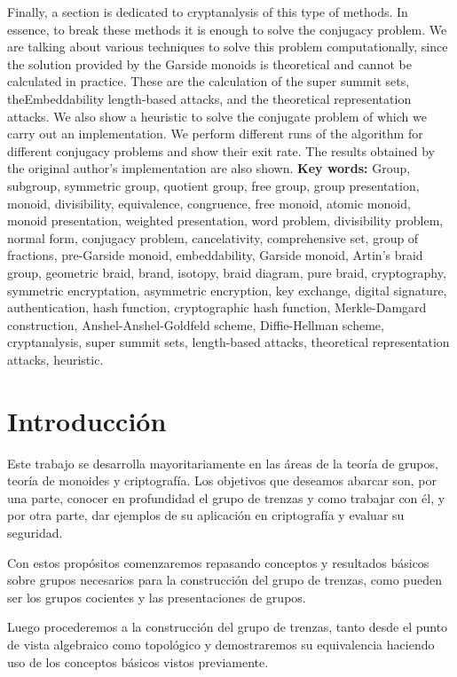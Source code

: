 \documentclass[12pt]{book}
\theoremstyle{definition}
\begin{document}
Finally, a section is dedicated to cryptanalysis of this type of methods. In essence, to break these methods it is enough to solve the conjugacy problem. We are talking about various techniques to solve this problem computationally, since the solution provided by the Garside monoids is theoretical and cannot be calculated in practice. These are the calculation of the super summit sets, theEmbeddability length-based attacks, and the theoretical representation attacks. We also show a heuristic to solve the conjugate problem of which we carry out an implementation. We perform different runs of the algorithm for different conjugacy problems and show their exit rate. The results obtained by the original author's implementation are also shown.
\newline
\newline
\textbf{Key words:} Group, subgroup, symmetric group, quotient group, free group, group presentation, monoid, divisibility, equivalence, congruence, free monoid, atomic monoid, monoid presentation,  weighted presentation, word problem, divisibility problem, normal form, conjugacy problem, cancelativity, comprehensive set, group of fractions, pre-Garside monoid, embeddability, Garside monoid, Artin’s braid group, geometric braid, brand, isotopy, braid diagram, pure braid, cryptography, symmetric encryptation, asymmetric encryption, key exchange, digital signature, authentication, hash function, cryptographic hash function, Merkle-Damgard construction, Anshel-Anshel-Goldfeld scheme, Diffie-Hellman scheme, cryptanalysis, super summit sets, length-based attacks, theoretical representation attacks, heuristic.
\chapter{Introducción}
Este trabajo se desarrolla mayoritariamente en las áreas de la teoría de grupos, teoría de monoides y criptografía.  Los objetivos que deseamos abarcar son, por una parte, conocer en profundidad el grupo de trenzas y como trabajar con él, y por otra parte, dar ejemplos de su aplicación en criptografía y evaluar su seguridad.

Con estos propósitos comenzaremos repasando conceptos y resultados básicos sobre grupos necesarios para la construcción del grupo de trenzas, como pueden ser los grupos cocientes y las presentaciones de grupos.

Luego procederemos a la construcción del grupo de trenzas, tanto desde el punto de vista algebraico como topológico y demostraremos su equivalencia haciendo uso de los conceptos básicos vistos previamente.
\end{document}
